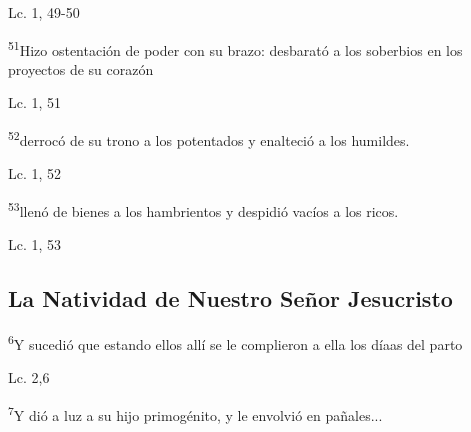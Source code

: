 \documentclass[a4paper,11pt]{article}
\begin{document}
      \begin{center}
        Lc. 1, 49-50          
      \end{center}
      
      \begin{center}
        \textsuperscript{51}Hizo ostentación de poder con su brazo: \newline
        desbarató a los soberbios en los proyectos de su corazón
      \end{center}

      \begin{center}
        Lc. 1, 51        
      \end{center}
      
      \begin{center}
        \textsuperscript{52}derrocó de su trono a los potentados \newline
        y enalteció a los humildes.
      \end{center}

      \begin{center}
        Lc. 1, 52       
      \end{center}      
      
      \begin{center}
        \textsuperscript{53}llenó de bienes a los hambrientos \newline
        y despidió vacíos a los ricos.
      \end{center}

      \begin{center}
        Lc. 1, 53        
      \end{center}
            
    \subsection*{\hfil La Natividad de Nuestro Señor Jesucristo \hfil}
      
      \begin{center}
        \textsuperscript{6}Y sucedió que estando ellos allí se le complieron a ella los díaas del parto
      \end{center}

      \begin{center}
        Lc. 2,6        
      \end{center}
      
      \begin{center}
        \textsuperscript{7}Y dió a luz a su hijo primogénito, y le envolvió en pañales...
      \end{center}
\end{document}
